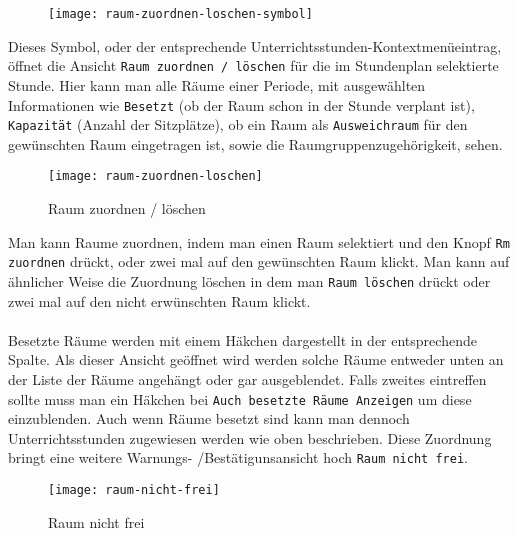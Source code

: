 \begin{wrapfigure}{r}{.05\textwidth}
	\vspace{-50pt}
	\texttt{[image: raum-zuordnen-loschen-symbol]}
	\vspace{-35pt}
\end{wrapfigure}

\noindent
Dieses Symbol, oder der entsprechende Unterrichtsstunden-Kontextmenüeintrag, öffnet die Ansicht \texttt{Raum zuordnen / löschen} für die im Stundenplan selektierte Stunde. Hier kann man alle Räume einer Periode, mit ausgewählten Informationen wie \texttt{Besetzt} (ob der Raum schon in der Stunde verplant ist), \texttt{Kapazität} (Anzahl der Sitzplätze), ob ein Raum als \texttt{Ausweichraum} für den gewünschten Raum eingetragen ist, sowie die Raumgruppenzugehörigkeit, sehen.\\

\begin{wrapfigure}{r}{0.3\textwidth}
	\vspace{-14pt}
	\texttt{[image: raum-zuordnen-loschen]}
	\vspace{-15pt}
	\caption{Raum zuordnen / löschen}
	\label{fig:raum-zuordnen-loschen}
\end{wrapfigure}

\noindent %
Man kann Raume zuordnen, indem man einen Raum selektiert und den Knopf \texttt{Rm zuordnen} drückt, oder  zwei mal auf den gewünschten Raum klickt. Man kann auf ähnlicher Weise die Zuordnung löschen in dem man \texttt{Raum löschen} drückt oder zwei mal auf den nicht erwünschten Raum klickt.\\
\\
Besetzte Räume werden mit einem Häkchen dargestellt in der entsprechende Spalte. Als dieser Ansicht geöffnet wird werden solche Räume entweder unten an der Liste der Räume angehängt oder gar ausgeblendet. Falls zweites eintreffen sollte muss man ein Häkchen bei \texttt{Auch besetzte Räume Anzeigen} um diese einzublenden. Auch wenn Räume besetzt sind kann man dennoch Unterrichtsstunden zugewiesen werden wie oben beschrieben. Diese Zuordnung bringt eine weitere Warnungs- /Bestätigunsansicht hoch \texttt{Raum nicht frei}.\\

\begin{wrapfigure}{r}{0.3\textwidth}
	\texttt{[image: raum-nicht-frei]}
	\vspace{-15pt}
	\caption{Raum nicht frei}
	\label{fig:raum-nicht-frei}
	\vspace{10pt}
\end{wrapfigure}

